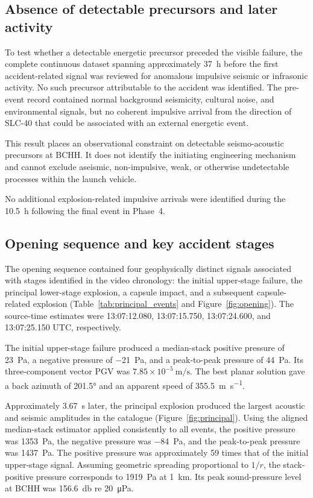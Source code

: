\documentclass[]{seismica}
\begin{document}
\subsection{Absence of detectable precursors and later activity}
\label{sec:results_onset}

To test whether a detectable energetic precursor preceded the visible failure,
the complete continuous dataset spanning approximately 37~h before the first
accident-related signal was reviewed for anomalous impulsive seismic or
infrasonic activity. No such precursor attributable to the accident was
identified. The pre-event record contained normal background seismicity,
cultural noise, and environmental signals, but no coherent impulsive arrival
from the direction of SLC-40 that could be associated with an external
energetic event.

This result places an observational constraint on detectable seismo-acoustic
precursors at BCHH. It does not identify the initiating engineering mechanism
and cannot exclude aseismic, non-impulsive, weak, or otherwise undetectable
processes within the launch vehicle.

No additional explosion-related impulsive arrivals were identified during the
10.5~h following the final event in Phase~4.


\subsection{Opening sequence and key accident stages}
\label{sec:results_principal}

The opening sequence contained four geophysically distinct signals associated
with stages identified in the video chronology: the initial upper-stage failure,
the principal lower-stage explosion, a capsule impact, and a subsequent
capsule-related explosion (Table~\ref{tab:principal_events} and Figure~\ref{fig:opening}). The source-time estimates were
13:07:12.080, 13:07:15.750, 13:07:24.600, and 13:07:25.150 UTC, respectively.

The initial upper-stage failure produced a median-stack positive pressure of
\SI{23}{\pascal}, a negative pressure of \SI{-21}{\pascal}, and a peak-to-peak
pressure of \SI{44}{\pascal}. Its three-component vector PGV was
$7.85\times10^{-5}\ \si{\metre\per\second}$. The best planar solution gave a
back azimuth of \ang{201.5} and an apparent speed of
\SI{355.5}{\metre\per\second}.

Approximately \SI{3.67}{\second} later, the principal explosion produced the
largest acoustic and seismic amplitudes in the catalogue (Figure~\ref{fig:principal}). Using the
aligned median-stack estimator applied consistently to all events, the positive
pressure was \SI{1353}{\pascal}, the negative pressure was
\SI{-84}{\pascal}, and the peak-to-peak pressure was \SI{1437}{\pascal}. The
positive pressure was approximately 59 times that of the initial upper-stage
signal. Assuming geometric spreading proportional to $1/r$, the stack-positive
pressure corresponds to \SI{1919}{\pascal} at \SI{1}{\kilo\metre}. Its peak
sound-pressure level at BCHH was \SI{156.6}{\decibel} re
\SI{20}{\micro\pascal}.
\end{document}
